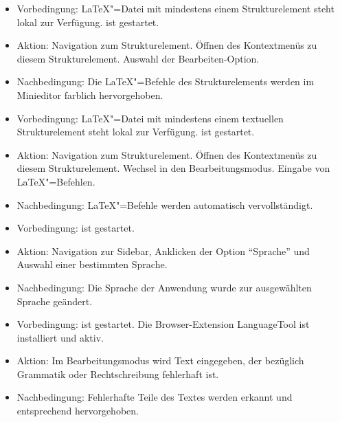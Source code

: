 \clearpage

\begin{itemize}
  \item Vorbedingung: \LaTeX"=Datei mit mindestens einem Strukturelement steht lokal zur Verfügung.
  \texla{} ist gestartet.
  \item Aktion: Navigation zum Strukturelement.
  Öffnen des Kontextmenüs zu diesem Strukturelement.
  Auswahl der Bearbeiten-Option.
  \item Nachbedingung: Die \LaTeX"=Befehle des Strukturelements werden im Minieditor farblich hervorgehoben.
\end{itemize}

\begin{itemize}
  \item Vorbedingung: \LaTeX"=Datei mit mindestens einem textuellen Strukturelement steht lokal zur Verfügung.
  \texla{} ist gestartet.
  \item Aktion: Navigation zum Strukturelement.
  Öffnen des Kontextmenüs zu diesem Strukturelement.
  Wechsel in den Bearbeitungsmodus.
  Eingabe von \LaTeX"=Befehlen.
  \item Nachbedingung: \LaTeX"=Befehle werden automatisch vervollständigt.
\end{itemize}

\begin{itemize}
  \item Vorbedingung: \texla{} ist gestartet.
  \item Aktion: Navigation zur Sidebar, Anklicken der Option \enquote{Sprache} und Auswahl einer bestimmten Sprache.
  \item Nachbedingung: Die Sprache der Anwendung wurde zur ausgewählten Sprache geändert.
\end{itemize}

\clearpage

\begin{itemize}
  \item Vorbedingung: \texla{} ist gestartet.
  Die Browser-Extension LanguageTool ist installiert und aktiv.
  \item Aktion: Im Bearbeitungsmodus wird Text eingegeben, der bezüglich Grammatik oder Rechtschreibung fehlerhaft
  ist.
  \item Nachbedingung: Fehlerhafte Teile des Textes werden erkannt und entsprechend hervorgehoben.
\end{itemize}

